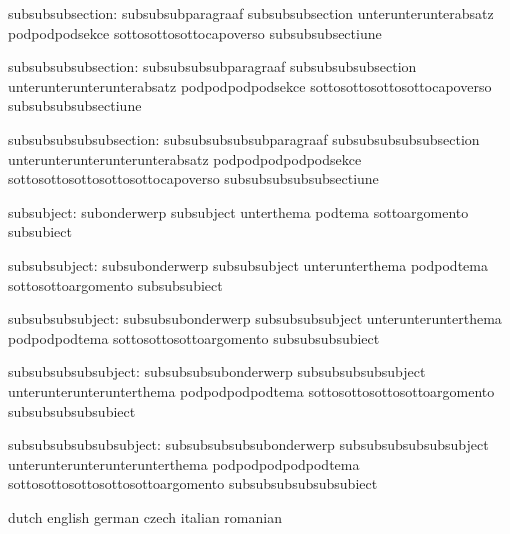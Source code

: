       subsubsubsection: subsubsubparagraaf                       subsubsubsection
                        unterunterunterabsatz                    podpodpodsekce
                        sottosottosottocapoverso                 subsubsubsectiune

   subsubsubsubsection: subsubsubsubparagraaf                    subsubsubsubsection
                        unterunterunterunterabsatz               podpodpodpodsekce
                        sottosottosottosottocapoverso            subsubsubsubsectiune

subsubsubsubsubsection: subsubsubsubsubparagraaf                 subsubsubsubsubsection
                        unterunterunterunterunterabsatz          podpodpodpodpodsekce
                        sottosottosottosottosottocapoverso       subsubsubsubsubsectiune

            subsubject: subonderwerp                             subsubject
                        unterthema                               podtema
                        sottoargomento                           subsubiect

         subsubsubject: subsubonderwerp                          subsubsubject
                        unterunterthema                          podpodtema
                        sottosottoargomento                      subsubsubiect

      subsubsubsubject: subsubsubonderwerp                       subsubsubsubject
                        unterunterunterthema                     podpodpodtema
                        sottosottosottoargomento                 subsubsubsubiect

   subsubsubsubsubject: subsubsubsubonderwerp                    subsubsubsubsubject
                        unterunterunterunterthema                podpodpodpodtema
                        sottosottosottosottoargomento            subsubsubsubsubiect

subsubsubsubsubsubject: subsubsubsubsubonderwerp                 subsubsubsubsubsubject
                        unterunterunterunterunterthema           podpodpodpodpodtema
                        sottosottosottosottosottoargomento       subsubsubsubsubsubiect

\stopvariables


\startvariables            dutch                     english
                           german                    czech
                           italian                   romanian

